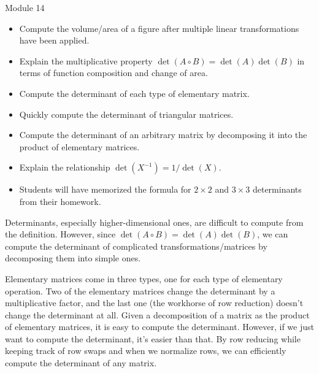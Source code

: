 \begin{lesson}

	Module 14

	\begin{itemize}
		\item Compute the volume/area of a figure after multiple linear transformations
			have been applied.
		\item Explain the multiplicative property $\det(A\circ B)=\det(A)\det(B)$ in terms
			of function composition and change of area.
		\item Compute the determinant of each type of elementary matrix.
		\item Quickly compute the determinant of triangular matrices.
		\item Compute the determinant of an arbitrary matrix by decomposing it into the product of elementary matrices.
		\item Explain the relationship $\det(X^{-1})=1/\det(X)$.
	\end{itemize}

	\begin{annotation}
		\begin{notes}
			\begin{itemize}
				\item Students will have memorized the formula for $2\times 2$ and $3\times 3$ determinants
					from their homework.
			\end{itemize}
		\end{notes}
	\end{annotation}
	Determinants, especially higher-dimensional ones, are difficult to compute from the definition. However,
	since $\det(A\circ B)=\det(A)\det(B)$, we can compute the determinant of complicated transformations/matrices
	by decomposing them into simple ones.

	Elementary matrices come in three types, one for each type of elementary operation. Two of the elementary
	matrices change the determinant by a multiplicative factor, and the last one (the workhorse of row reduction) doesn't
	change the determinant at all. Given a decomposition of a matrix as the product of elementary matrices,
	it is easy to compute the determinant. However, if we just want to compute the determinant, it's easier than that.
	By row reducing while keeping track of row swaps and when
	we normalize rows, we can efficiently compute the determinant of any matrix.


\end{lesson}
